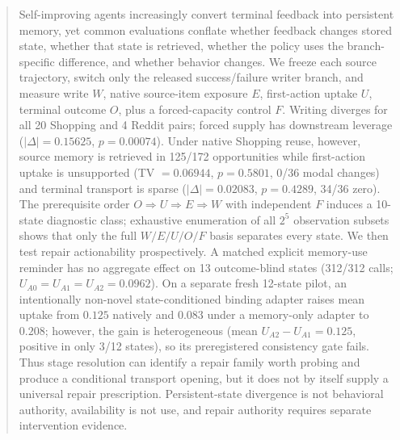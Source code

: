 \begin{abstract}
Self-improving agents increasingly convert terminal feedback into persistent memory, yet common evaluations conflate whether feedback changes stored state, whether that state is retrieved, whether the policy uses the branch-specific difference, and whether behavior changes. We freeze each source trajectory, switch only the released success/failure writer branch, and measure write $W$, native source-item exposure $E$, first-action uptake $U$, terminal outcome $O$, plus a forced-capacity control $F$. Writing diverges for all 20 Shopping and 4 Reddit pairs; forced supply has downstream leverage ($|\Delta|=0.15625$, $p=0.00074$). Under native Shopping reuse, however, source memory is retrieved in 125/172 opportunities while first-action uptake is unsupported (TV $=0.06944$, $p=0.5801$, 0/36 modal changes) and terminal transport is sparse ($|\Delta|=0.02083$, $p=0.4289$, 34/36 zero). The prerequisite order $O\Rightarrow U\Rightarrow E\Rightarrow W$ with independent $F$ induces a 10-state diagnostic class; exhaustive enumeration of all $2^5$ observation subsets shows that only the full $W/E/U/O/F$ basis separates every state. We then test repair actionability prospectively. A matched explicit memory-use reminder has no aggregate effect on 13 outcome-blind states (312/312 calls; $U_{A0}=U_{A1}=U_{A2}=0.0962$). On a separate fresh 12-state pilot, an intentionally non-novel state-conditioned binding adapter raises mean uptake from $0.125$ natively and $0.083$ under a memory-only adapter to $0.208$; however, the gain is heterogeneous (mean $U_{A2}-U_{A1}=0.125$, positive in only 3/12 states), so its preregistered consistency gate fails. Thus stage resolution can identify a repair family worth probing and produce a conditional transport opening, but it does not by itself supply a universal repair prescription. Persistent-state divergence is not behavioral authority, availability is not use, and repair authority requires separate intervention evidence.
\end{abstract}
